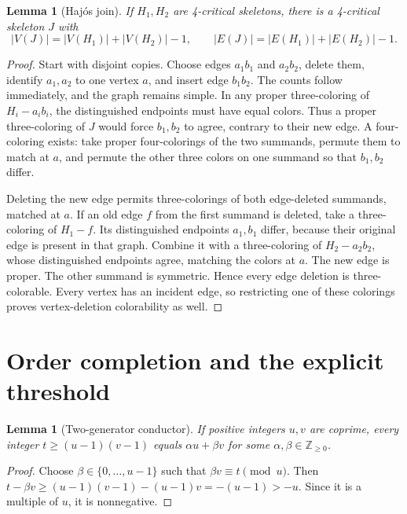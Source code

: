 \documentclass[11pt]{article}
\newtheorem{lemma}[theorem]{Lemma}
\newcommand{\Z}{\mathbb Z}
\begin{document}
\begin{lemma}[Haj\'os join]\label{lem:hajos}
If $H_1,H_2$ are 4-critical skeletons, there is a 4-critical skeleton $J$
with
\[
|V(J)|=|V(H_1)|+|V(H_2)|-1,\qquad
|E(J)|=|E(H_1)|+|E(H_2)|-1.
\]
\end{lemma}

\begin{proof}
Start with disjoint copies. Choose edges $a_1b_1$ and $a_2b_2$, delete
them, identify $a_1,a_2$ to one vertex $a$, and insert edge $b_1b_2$.
The counts follow immediately, and the graph remains simple.
In any proper three-coloring of $H_i-a_ib_i$, the distinguished endpoints
must have equal colors. Thus a proper three-coloring of $J$ would force
$b_1,b_2$ to agree, contrary to their new edge. A four-coloring exists:
take proper four-colorings of the two summands, permute them to match
at $a$, and permute the other three colors on one summand so that
$b_1,b_2$ differ.

Deleting the new edge permits three-colorings of both edge-deleted
summands, matched at $a$. If an old edge $f$ from the first summand is
deleted, take a three-coloring of $H_1-f$. Its distinguished endpoints
$a_1,b_1$ differ, because their original edge is present in that graph.
Combine it with a three-coloring of $H_2-a_2b_2$, whose distinguished
endpoints agree, matching the colors at $a$. The new edge is proper.
The other summand is symmetric. Hence every edge deletion is
three-colorable. Every vertex has an incident edge, so restricting
one of these colorings proves vertex-deletion colorability as well.
\end{proof}

\section{Order completion and the explicit threshold}

\begin{lemma}[Two-generator conductor]\label{lem:coins}
If positive integers $u,v$ are coprime, every integer
$t\geq(u-1)(v-1)$ equals $\alpha u+\beta v$ for some
$\alpha,\beta\in\Z_{\geq0}$.
\end{lemma}

\begin{proof}
Choose $\beta\in\{0,\ldots,u-1\}$ such that $\beta v\equiv t\pmod u$.
Then
$t-\beta v\geq (u-1)(v-1)-(u-1)v=-(u-1)>-u$.
Since it is a multiple of $u$, it is nonnegative.
\end{proof}
\end{document}
